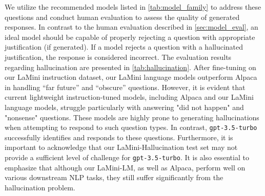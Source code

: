 \documentclass[11pt]{article}
\newcommand{\modelname}{LaMini\xspace}
\newcommand{\modelnamefull}{LaMini-LM\xspace}
\newcommand{\laminihallucination}{LaMini-Hallucination\xspace}
\newcommand{\llm}[1]{\texttt{#1}\xspace}
\newcommand{\chatgpt}{\llm{gpt-3.5-turbo}}
\begin{document}
We utilize the recommended models listed in \autoref{tab:model_family} to address these questions and conduct human evaluation to assess the quality of generated responses. 
In contrast to the human evaluation described in \autoref{sec:model_eval}, an ideal model should be capable of properly rejecting a question with appropriate justification (if generated).
If a model rejects a question with a hallucinated justification, the response is considered incorrect. The evaluation results regarding hallucination are presented in \autoref{tab:hallucination}.
After fine-tuning on our \modelname instruction dataset, our \modelname language models outperform Alpaca in handling ``far future'' and ``obscure'' questions.
However, it is evident that current lightweight instruction-tuned models, including Alpaca and our \modelname language models, struggle particularly with answering "did not happen" and "nonsense" questions. These models are highly prone to generating hallucinations when attempting to respond to such question types. In contrast, \chatgpt successfully identifies and responds to these questions.
Furthermore, it is important to acknowledge that our \laminihallucination test set may not provide a sufficient level of challenge for \chatgpt. It is also essential to emphasize that although our \modelnamefull, as well as Alpaca, perform well on various downstream NLP tasks, they still suffer significantly from the hallucination problem.
\end{document}
